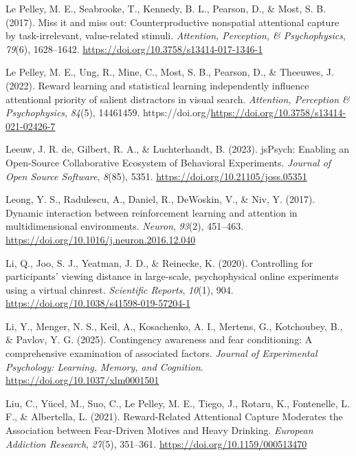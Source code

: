 \documentclass[
  man,
  floatsintext,
  longtable,
  nolmodern,
  notxfonts,
  notimes,
  mask,
  colorlinks=true,linkcolor=blue,citecolor=blue,urlcolor=blue]{apa7}
\newlength{\cslhangindent}
\newenvironment{CSLReferences}[2] %
 {\begin{list}{}{%
  \setlength{\itemindent}{0pt}
  \setlength{\leftmargin}{0pt}
  \setlength{\parsep}{0pt}
  \ifodd #1
   \setlength{\leftmargin}{\cslhangindent}
   \setlength{\itemindent}{-1\cslhangindent}
  \fi
  \setlength{\itemsep}{#2\baselineskip}}}
 {\end{list}}
\begin{document}
\begin{CSLReferences}{1}{0}
Le Pelley, M. E., Seabrooke, T., Kennedy, B. L., Pearson, D., \& Most,
S. B. (2017). Miss it and miss out: Counterproductive nonspatial
attentional capture by task-irrelevant, value-related stimuli.
\emph{Attention, Perception, \& Psychophysics}, \emph{79}(6),
1628--1642. \url{https://doi.org/10.3758/s13414-017-1346-1}

Le Pelley, M. E., Ung, R., Mine, C., Most, S. B., Pearson, D., \&
Theeuwes, J. (2022). Reward learning and statistical learning
independently influence attentional priority of salient distractors in
visual search. \emph{Attention, Perception \& Psychophysics},
\emph{84}(5), 14461459.
https://doi.org/\url{https://doi.org/10.3758/s13414-021-02426-7}

Leeuw, J. R. de, Gilbert, R. A., \& Luchterhandt, B. (2023). jsPsych:
Enabling an Open-Source Collaborative Ecosystem of Behavioral
Experiments. \emph{Journal of Open Source Software}, \emph{8}(85), 5351.
\url{https://doi.org/10.21105/joss.05351}

Leong, Y. S., Radulescu, A., Daniel, R., DeWoskin, V., \& Niv, Y.
(2017). Dynamic interaction between reinforcement learning and attention
in multidimensional environments. \emph{Neuron}, \emph{93}(2), 451--463.
\url{https://doi.org/10.1016/j.neuron.2016.12.040}

Li, Q., Joo, S. J., Yeatman, J. D., \& Reinecke, K. (2020). Controlling
for participants{'} viewing distance in large-scale, psychophysical
online experiments using a virtual chinrest. \emph{Scientific Reports},
\emph{10}(1), 904. \url{https://doi.org/10.1038/s41598-019-57204-1}

Li, Y., Menger, N. S., Keil, A., Kosachenko, A. I., Mertens, G.,
Kotchoubey, B., \& Pavlov, Y. G. (2025). Contingency awareness and fear
conditioning: {A} comprehensive examination of associated factors.
\emph{Journal of Experimental Psychology: Learning, Memory, and
Cognition}. \url{https://doi.org/10.1037/xlm0001501}

Liu, C., Yücel, M., Suo, C., Le Pelley, M. E., Tiego, J., Rotaru, K.,
Fontenelle, L. F., \& Albertella, L. (2021). Reward-Related Attentional
Capture Moderates the Association between Fear-Driven Motives and Heavy
Drinking. \emph{European Addiction Research}, \emph{27}(5), 351--361.
\url{https://doi.org/10.1159/000513470}


\end{CSLReferences}
\end{document}
